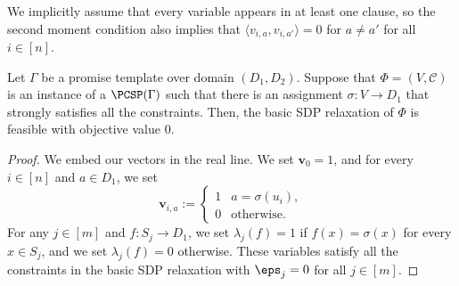 %
{We implicitly assume that every variable appears in at least one clause, so the second moment condition also implies that $\langle v_{i,a}, v_{i,a'} \rangle = 0$ for $a \neq a'$ for all $i \in [n]$.}

\begin{proposition}\label{prop:basic-SDP-completeness}
Let $\Gamma$ be a promise template over domain $(D_1, D_2)$. Suppose that $\Phi=(V,\mathcal{C})$ is an instance of a $\PCSP(\Gamma)$ such that there is an assignment $\sigma : V \rightarrow D_1$ that strongly satisfies all the constraints. Then, the basic SDP {relaxation of $\Phi$} is feasible {with objective value $0$}.
\end{proposition}
\begin{proof}
    {We embed our vectors in the real line.} We set $\textbf{v}_0=1$, and for every $i \in [n]$ and $a \in D_1$, we set
    \[
        \textbf{v}_{i,a} := \begin{cases}
        1 & a = \sigma(u_i),\\
        0 & \text{otherwise.}
        \end{cases}
    \] {For any} $j \in [m]$ and $f:{S}_j \to D_1$, we set $\lambda_j(f)=1$ if $f(x)=\sigma(x)$ for every $x \in {S}_j$, and we set $\lambda_j(f)=0$ otherwise. These variables satisfy all the constraints in the basic SDP relaxation with $\eps_j=0$ for all $j \in [m]$.
\end{proof}
